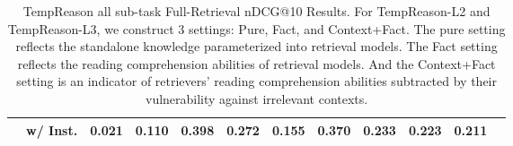 \begin{table}[!tp]
{\begin{tabular}{lr|ccccccc|ccc}
& w/ Inst. & 0.021 & 0.110 & 0.398 & 0.272 & 0.155 & 0.370 & 0.233 & 0.223 & 0.211 \\
\bottomrule
\end{tabular}}
\caption{TempReason all sub-task Full-Retrieval nDCG@10 Results. For TempReason-L2 and TempReason-L3, we construct 3 settings: Pure, Fact, and Context+Fact. The pure setting reflects the standalone knowledge parameterized into retrieval models. The Fact setting reflects the reading comprehension abilities of retrieval models. And the Context+Fact setting is an indicator of retrievers' reading comprehension abilities subtracted by their vulnerability against irrelevant contexts.}\label{tab: tempreason full retrieval}
\end{table}